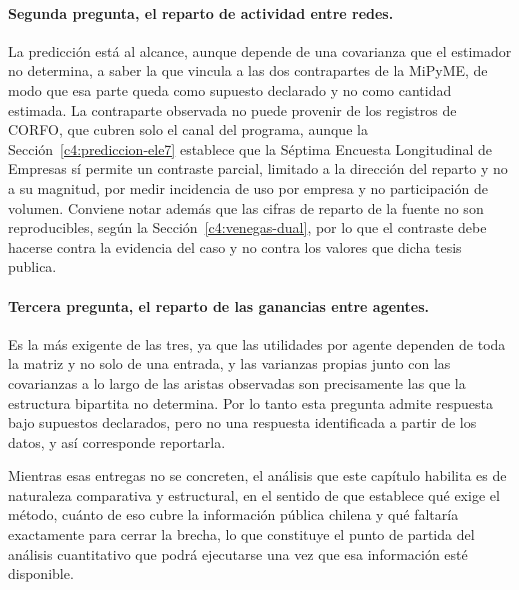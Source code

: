 \paragraph{Segunda pregunta, el reparto de actividad entre redes.} La predicción
está al alcance, aunque depende de una covarianza que el estimador no determina,
a saber la que vincula a las dos contrapartes de la MiPyME, de modo que esa parte
queda como supuesto declarado y no como cantidad estimada.
La contraparte observada no puede provenir de los registros de CORFO, que cubren
solo el canal del programa, aunque la Sección~\ref{c4:prediccion-ele7} establece
que la Séptima Encuesta Longitudinal de Empresas sí permite un contraste parcial,
limitado a la dirección del reparto y no a su magnitud, por medir incidencia de
uso por empresa y no participación de volumen. Conviene notar además que
las cifras de reparto de la fuente no son reproducibles, según la
Sección~\ref{c4:venegas-dual}, por lo que el contraste debe hacerse contra la
evidencia del caso y no contra los valores que dicha tesis publica.

\paragraph{Tercera pregunta, el reparto de las ganancias entre agentes.} Es la
más exigente de las tres, ya que las utilidades por agente dependen de toda la
matriz y no solo de una entrada, y las varianzas propias junto con las
covarianzas a lo largo de las aristas observadas son precisamente las que la
estructura bipartita no determina. Por lo tanto esta pregunta admite respuesta
bajo supuestos declarados, pero no una respuesta identificada a partir de los
datos, y así corresponde reportarla.

Mientras esas entregas no se concreten, el análisis que este capítulo habilita es de naturaleza comparativa y estructural, en el sentido de que establece qué exige el método, cuánto de eso cubre la información pública chilena y qué faltaría exactamente para cerrar la brecha, lo que constituye el punto de partida del análisis cuantitativo que podrá ejecutarse una vez que esa información esté disponible.
